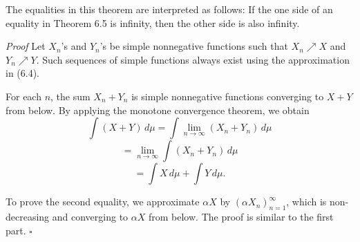 The equalities in this theorem are interpreted as follows: If the one side of an equality in Theorem 6.5 is infinity, then the other side is also infinity.

\textit{Proof} Let $X_n$'s and $Y_n$'s be simple nonnegative functions such that $X_n \nearrow X$ and $Y_n \nearrow Y$. Such sequences of simple functions always exist using the approximation in (6.4).

For each $n$, the sum $X_n+Y_n$ is simple nonnegative functions converging to $X+Y$ from below. By applying the monotone convergence theorem, we obtain
\[
\int (X+Y)\, d\mu = \int \lim_{n\to\infty} (X_n+Y_n)\, d\mu
\]
\[
= \lim_{n\to\infty} \int (X_n+Y_n)\, d\mu
\]
\[
= \int X\, d\mu + \int Y\, d\mu.
\]

To prove the second equality, we approximate $\alpha X$ by $(\alpha X_n)_{n=1}^{\infty}$, which is non-decreasing and converging to $\alpha X$ from below. The proof is similar to the first part. \hfill $\square$
